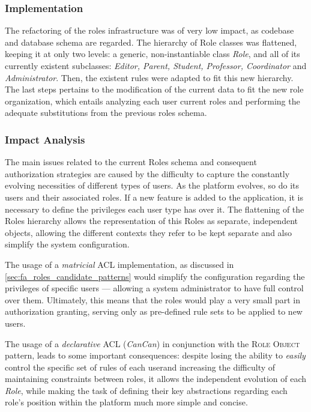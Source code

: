 \subsubsection{Implementation}\label{sec:fa_roles_implementation}

The refactoring of the roles infrastructure was of very low impact, as codebase and database schema are regarded. The hierarchy of Role classes was flattened, keeping it at only two levels: a generic, non-instantiable class \emph{Role}, and all of its currently existent subclasses: \emph{Editor, Parent, Student, Professor, Coordinator} and \emph{Administrator}. Then, the existent rules were adapted to fit this new hierarchy. The last steps pertains to the modification of the current data to fit the new role organization, which entails analyzing each user current roles and performing the adequate substitutions from the previous roles schema. 

\subsubsection{Impact Analysis}\label{sec:fa_roles_impact_analysis}

The main issues related to the current Roles schema and consequent authorization strategies are caused by the difficulty to capture the constantly evolving necessities of different types of users. As the platform evolves, so do its users and their associated roles. If a new feature is added to the application, it is necessary to define the privileges each user type has over it. The flattening of the Roles hierarchy allows the representation of this Roles as separate, independent objects, allowing the different contexts they refer to be kept separate and also simplify the system configuration.

The usage of a \emph{matricial} ACL implementation, as discussed in \ref{sec:fa_roles_candidate_patterns} would simplify the configuration regarding the privileges of specific users --- allowing a system administrator to have full control over them. Ultimately, this means that the roles would play a very small part in authorization granting, serving only as pre-defined rule sets to be applied to new users.

The usage of a \emph{declarative} ACL (\emph{CanCan}) in conjunction with the \textsc{Role Object} pattern, leads to some important consequences: despite losing the ability to \emph{easily} control the specific set of rules of each user\footnotemark and increasing the difficulty of maintaining constraints between roles, it allows the independent evolution of each \emph{Role}, while making the task of defining their key abstractions regarding each role's position within the platform much more simple and concise.


